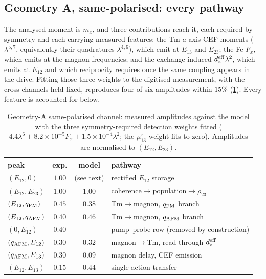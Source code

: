 \documentclass[11pt]{article}
\newcommand{\qafm}{q_{\rm AFM}}
\newcommand{\qfm}{q_{\rm FM}}
\begin{document}
\subsection{Geometry A, same-polarised: every pathway}
\label{si:peaksAsame}

The analysed moment is $m_x$, and three contributions reach it, each
required by symmetry and each carrying measured features: the Tm
$a$-axis CEF moments ($\lambda^{5,7}$, equivalently their quadratures
$\lambda^{4,6}$), which emit at $E_{13}$ and $E_{23}$; the Fe $F_x$,
which emits at the magnon frequencies; and the exchange-induced
$d_z^{\rm eff}\lambda^2$, which emits at $E_{12}$ and which reciprocity
requires once the same coupling appears in the drive.  Fitting those
three weights to the digitised measurement, with the cross channels
held fixed, reproduces four of six amplitudes within $15\%$
(\cref{tab:si-samepolfit}).  Every feature is accounted for below.

\begin{table}[h]
\centering\small
\caption{Geometry-A same-polarised channel: measured amplitudes against
the model with the three symmetry-required detection weights fitted
($4.4\lambda^6+8.2\times10^{-5}F_x+1.5\times10^{-4}\lambda^2$; the
$\mu^z_{13}$ weight fits to zero).  Amplitudes are normalised to
$(E_{12},E_{23})$.}
\label{tab:si-samepolfit}
\renewcommand{\arraystretch}{1.25}
\begin{tabular}{lccl}
\toprule
peak & exp. & model & pathway\\
\midrule
$(E_{12},0)$ & $1.00$ & (see text) & rectified $E_{12}$ storage\\
$(E_{12},E_{23})$ & $1.00$ & $1.00$ &
  coherence$\to$population$\to\rho_{23}$\\
$(E_{12},\qfm)$ & $0.45$ & $0.38$ & Tm$\to$magnon, $\qfm$ branch\\
$(E_{12},\qafm)$ & $0.40$ & $0.46$ & Tm$\to$magnon, $\qafm$ branch\\
$(0,E_{12})$ & $0.40$ & --- & pump--probe row (removed by construction)\\
$(\qafm,E_{12})$ & $0.30$ & $0.32$ &
  magnon$\to$Tm, read through $d_z^{\rm eff}$\\
$(\qafm,E_{13})$ & $0.30$ & $0.09$ & magnon delay, CEF emission\\
$(E_{12},E_{13})$ & $0.15$ & $0.44$ & single-action transfer\\
\bottomrule
\end{tabular}
\end{table}
\end{document}
